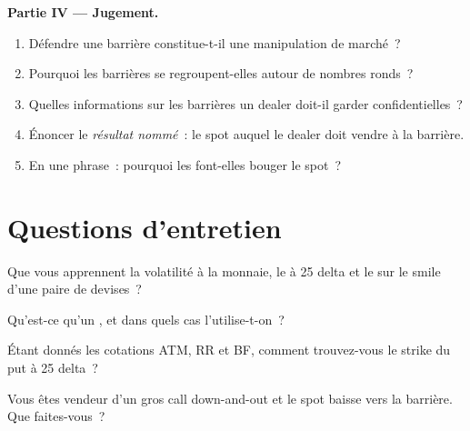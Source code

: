 \begin{problem}
\medskip\noindent\textbf{Partie IV --- Jugement.}
\begin{enumerate}[resume]
\item Défendre une barrière constitue-t-il une manipulation de marché~?
\item Pourquoi les barrières se regroupent-elles autour de nombres ronds~?
\item Quelles informations sur les barrières un dealer doit-il garder confidentielles~?
\item Énoncer le \emph{résultat nommé}~: le spot auquel le dealer doit vendre à la barrière.
\item En une phrase~: pourquoi les  font-elles bouger le spot~?
\end{enumerate}
\end{problem}

\section{Questions d'entretien}

\begin{interviewq}\label{iq:m2:the-fx-options-market:1}
Que vous apprennent la volatilité à la monnaie, le  à 25 delta et le 
sur le smile d'une paire de devises~?
\end{interviewq}

\begin{interviewq}\label{iq:m2:the-fx-options-market:2}
Qu'est-ce qu'un , et dans quels cas l'utilise-t-on~?
\end{interviewq}

\begin{interviewq}\label{iq:m2:the-fx-options-market:3}
Étant donnés les cotations ATM, RR et BF, comment trouvez-vous le strike du put à 25 delta~?
\end{interviewq}

\begin{interviewq}\label{iq:m2:the-fx-options-market:4}
Vous êtes vendeur d'un gros call down-and-out et le spot baisse vers la barrière.
Que faites-vous~?
\end{interviewq}

